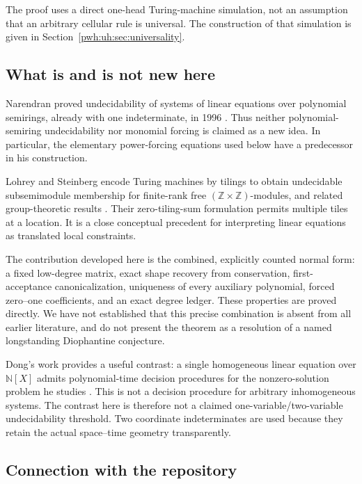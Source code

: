 \documentclass[11pt,letterpaper]{article}
\numberwithin{equation}{section}
\theoremstyle{definition}
\newcommand{\N}{\mathbb N}
\newcommand{\Z}{\mathbb Z}
\begin{document}
The proof uses a direct one-head Turing-machine simulation, not an
assumption that an arbitrary cellular rule is universal. The construction
of that simulation is given in Section~\ref{pwh:uh:sec:universality}.

\subsection{What is and is not new here}

Narendran proved undecidability of systems of linear equations over
polynomial semirings, already with one indeterminate, in 1996
\cite{uh:Narendran}. Thus neither polynomial-semiring undecidability nor
monomial forcing is claimed as a new idea. In particular, the elementary
power-forcing equations used below have a predecessor in his construction.

Lohrey and Steinberg encode Turing machines by tilings to obtain
undecidable subsemimodule membership for finite-rank free
$(\Z\times\Z)$-modules, and related group-theoretic results
\cite{uh:LohreySteinberg}. Their zero-tiling-sum formulation permits multiple
tiles at a location. It is a close conceptual precedent for interpreting
linear equations as translated local constraints.

The contribution developed here is the combined, explicitly counted
normal form: a fixed low-degree matrix, exact shape recovery from
conservation, first-acceptance canonicalization, uniqueness of every
auxiliary polynomial, forced zero--one coefficients, and an exact degree
ledger. These properties are proved directly. We have not established that
this precise combination is absent from all earlier literature, and do
not present the theorem as a resolution of a named longstanding
Diophantine conjecture.

Dong's work provides a useful contrast: a single homogeneous linear
equation over $\N[X]$ admits polynomial-time decision procedures for the
nonzero-solution problem he studies \cite{uh:Dong}. This is not a decision
procedure for arbitrary inhomogeneous systems. The contrast here is
therefore not a claimed one-variable/two-variable undecidability threshold.
Two coordinate indeterminates are used because they retain the actual
space--time geometry transparently.

\subsection{Connection with the repository}
\end{document}
